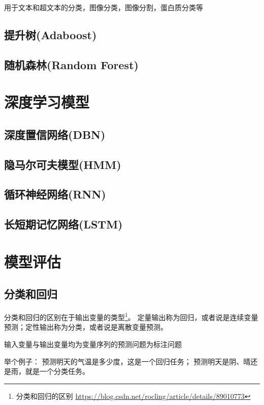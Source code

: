 用于文本和超文本的分类，图像分类，图像分割，蛋白质分类等

\subsection{提升树(Adaboost)}

\subsection{随机森林(Random Forest)}

\section{深度学习模型}

\subsection{深度置信网络(DBN)}

\subsection{隐马尔可夫模型(HMM)}

\subsection{循环神经网络(RNN)}

\subsection{长短期记忆网络(LSTM)}

\section{模型评估}

\subsection{分类和回归}

分类和回归的区别在于输出变量的类型\footnote{分类和回归的区别 \quad \url{https://blog.csdn.net/rocling/article/details/89010773}}。 定量输出称为回归，或者说是连续变量预测；定性输出称为分类，或者说是离散变量预测。

输入变量与输出变量均为变量序列的预测问题为标注问题

举个例子：
预测明天的气温是多少度，这是一个回归任务；
预测明天是阴、晴还是雨，就是一个分类任务。

